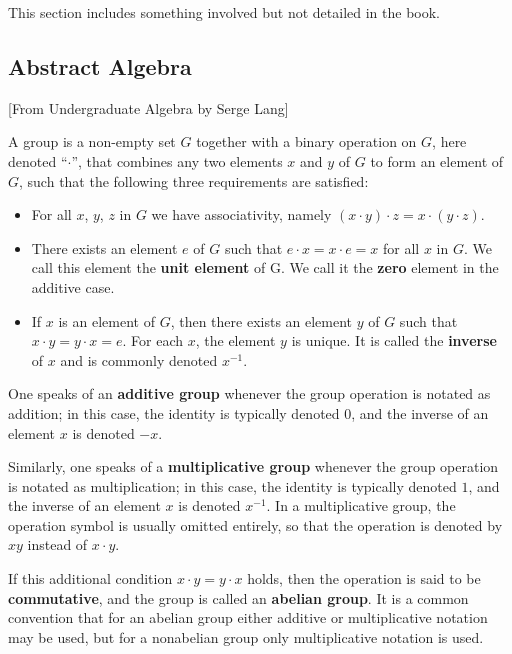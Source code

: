 This section includes something involved but not detailed in the book.


\subsection{Abstract Algebra}[From Undergraduate Algebra by Serge Lang]
\begin{defn}[Group]
    A group is a non-empty set $G$ together with a binary operation on $G$, here denoted ``$\cdot$'', that combines any two elements $x$ and $y$ of $G$ to form an element of $G$, such that the following three requirements are satisfied:
    \begin{itemize}
        \item For all $x$, $y$, $z$ in $G$ we have associativity, namely $(x\cdot y)\cdot z = x\cdot (y\cdot z)$.
        \item There exists an element $e$ of $G$ such that $e\cdot x=x\cdot e=x$ for all $x$ in $G$. We call this element the \textbf{unit element} of G. We call it the \textbf{zero} element in the additive case. 
        \item If $x$ is an element of $G$, then there exists an element $y$ of $G$ such that $x\cdot y = y\cdot x = e$. For each $x$, the element $y$ is unique. It is called the \textbf{inverse} of $x$ and is commonly denoted $x^{-1}$.
    \end{itemize}
\end{defn}
One speaks of an \textbf{additive group} whenever the group operation is notated as addition; in this case, the identity is typically denoted $0$, and the inverse of an element $x$ is denoted $-x$. 

Similarly, one speaks of a \textbf{multiplicative group} whenever the group operation is notated as multiplication; in this case, the identity is typically denoted $1$, and the inverse of an element $x$ is denoted $x^{-1}$. In a multiplicative group, the operation symbol is usually omitted entirely, so that the operation is denoted by $xy$ instead of $x\cdot y$.

If this additional condition $x\cdot y=y\cdot x$ holds, then the operation is said to be \textbf{commutative}, and the group is called an \textbf{abelian group}. It is a common convention that for an abelian group either additive or multiplicative notation may be used, but for a nonabelian group only multiplicative notation is used.

